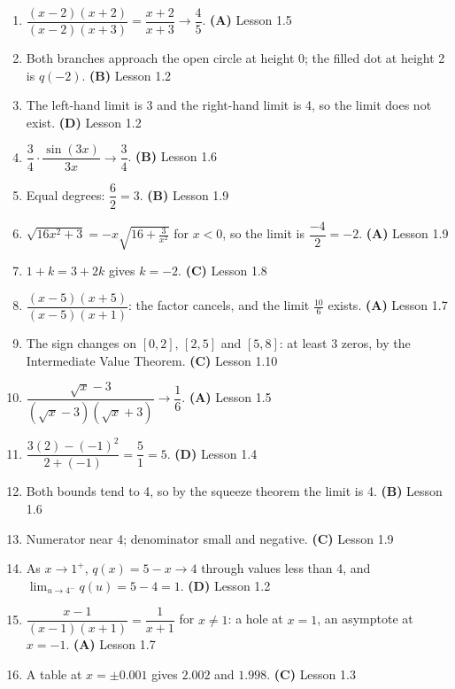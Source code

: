 \documentclass[11pt]{article}
\begin{document}
\begin{solbox}
\begin{enumerate}[leftmargin=*,itemsep=3pt]
  \item $\dfrac{(x-2)(x+2)}{(x-2)(x+3)}=\dfrac{x+2}{x+3}\to\dfrac45$. \textbf{(A)} \hfill{\footnotesize Lesson 1.5}
  \item Both branches approach the open circle at height 0; the filled dot at height 2 is $q(-2)$. \textbf{(B)} \hfill{\footnotesize Lesson 1.2}
  \item The left-hand limit is 3 and the right-hand limit is 4, so the limit does not exist. \textbf{(D)} \hfill{\footnotesize Lesson 1.2}
  \item $\dfrac34\cdot\dfrac{\sin(3x)}{3x}\to\dfrac34$. \textbf{(B)} \hfill{\footnotesize Lesson 1.6}
  \item Equal degrees: $\dfrac62=3$. \textbf{(B)} \hfill{\footnotesize Lesson 1.9}
  \item $\sqrt{16x^2+3}=-x\sqrt{16+\tfrac{3}{x^2}}$ for $x<0$, so the limit is $\dfrac{-4}{2}=-2$. \textbf{(A)} \hfill{\footnotesize Lesson 1.9}
  \item $1+k=3+2k$ gives $k=-2$. \textbf{(C)} \hfill{\footnotesize Lesson 1.8}
  \item $\dfrac{(x-5)(x+5)}{(x-5)(x+1)}$: the factor cancels, and the limit $\tfrac{10}{6}$ exists. \textbf{(A)} \hfill{\footnotesize Lesson 1.7}
  \item The sign changes on $[0,2]$, $[2,5]$ and $[5,8]$: at least 3 zeros, by the Intermediate Value Theorem. \textbf{(C)} \hfill{\footnotesize Lesson 1.10}
  \item $\dfrac{\sqrt x-3}{(\sqrt x-3)(\sqrt x+3)}\to\dfrac16$. \textbf{(A)} \hfill{\footnotesize Lesson 1.5}
  \item $\dfrac{3(2)-(-1)^2}{2+(-1)}=\dfrac51=5$. \textbf{(D)} \hfill{\footnotesize Lesson 1.4}
  \item Both bounds tend to 4, so by the squeeze theorem the limit is 4. \textbf{(B)} \hfill{\footnotesize Lesson 1.6}
  \item Numerator near 4; denominator small and negative. \textbf{(C)} \hfill{\footnotesize Lesson 1.9}
  \item As $x\to1^+$, $q(x)=5-x\to4$ through values less than 4, and $\displaystyle\lim_{u\to 4^-}q(u)=5-4=1$. \textbf{(D)} \hfill{\footnotesize Lesson 1.2}
  \item $\dfrac{x-1}{(x-1)(x+1)}=\dfrac{1}{x+1}$ for $x\neq1$: a hole at $x=1$, an asymptote at $x=-1$. \textbf{(A)} \hfill{\footnotesize Lesson 1.7}
  \item A table at $x=\pm0.001$ gives $2.002$ and $1.998$. \textbf{(C)} \hfill{\footnotesize Lesson 1.3}

\end{enumerate}
\end{solbox}
\end{document}
